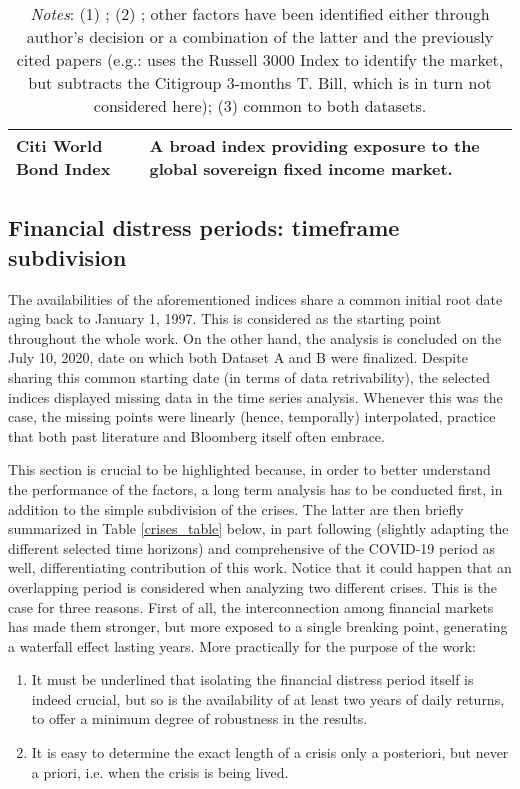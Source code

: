 \documentclass[12pt]{article}
\begin{document}
\begin{table}[H]
{\begin{tabular}{@{}lllll@{}}
Citi World Bond Index               & \multicolumn{4}{l}{A broad index providing exposure to the global sovereign fixed income market.}                                                  \\ \bottomrule
\end{tabular}}
\bigskip
\caption*{\textit{Notes}: (1) \protect{}; (2) \protect{}; other factors have been identified either through author's decision or a combination of the latter and the previously cited papers (e.g.: \protect{} uses the Russell 3000 Index to identify the market, but subtracts the Citigroup 3-months T. Bill, which is in turn not considered here); (3) common to both datasets.}
\end{table}

\subsection{Financial distress periods: timeframe subdivision} \label{section3.2}

The availabilities of the aforementioned indices share a common initial root date aging back to January 1, 1997. This is  considered as the starting point throughout the whole work. On the other hand, the analysis is concluded on the July 10, 2020, date on which both Dataset A and B were finalized. Despite sharing this common starting date (in terms of data retrivability), the selected indices displayed missing data in the time series analysis. Whenever this was the case, the missing points were linearly (hence, temporally) interpolated, practice that both past literature and Bloomberg itself often embrace.

This section is crucial to be highlighted because, in order to better understand the performance of the factors, a long term analysis has to be conducted first, in addition to the simple subdivision of the crises. The latter are then briefly summarized in Table \ref{crises_table} below, in part following  (slightly adapting the different selected time horizons) and comprehensive of the COVID-19 period as well, differentiating contribution of this work. Notice that it could happen that an overlapping period is considered when analyzing two different crises. This is the case for three reasons. First of all, the interconnection among financial markets has made them stronger, but more exposed to a single breaking point, generating a waterfall effect lasting years. More practically for the purpose of the work:
\begin{enumerate}
\item It must be underlined that isolating the financial distress period itself is indeed crucial, but so is the availability of at least two years of daily returns, to offer a minimum degree of robustness in the results.
\item It is easy to determine the exact length of a crisis only a posteriori, but never a priori, i.e. when the crisis is being lived.
\end{enumerate}
\end{document}
